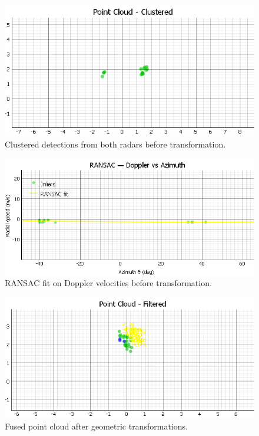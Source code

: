 \begin{figure}[!htbp]
    \centering
    \includegraphics[width=0.9\linewidth]{images/dualSensorCalibCluster_2mts.png}
    \caption{Clustered detections from both radars before transformation.}
    \label{fig:dualSensorCalibCluster_2mts}
\end{figure}

\begin{figure}[!htbp]
    \centering
    \includegraphics[width=0.9\linewidth]{images/dualSensorCalibRANSAC_2mts.png}
    \caption{RANSAC fit on Doppler velocities before transformation.}
    \label{fig:dualSensorCalibRANSAC_2mts}
\end{figure}

\begin{figure}[!htbp]
    \centering
    \includegraphics[width=0.9\linewidth]{images/AFTERdualSensorCalib_2mts.png}
    \caption{Fused point cloud after geometric transformations.}
    \label{fig:AFTERdualSensorCalib_2mts}
\end{figure}

